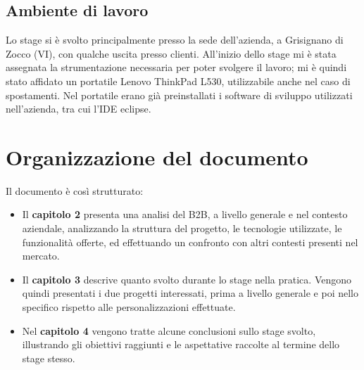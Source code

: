 \subsection{Ambiente di lavoro}
Lo stage si è svolto principalmente presso la sede dell'azienda, a Grisignano di Zocco (VI), con qualche uscita presso clienti. All'inizio dello stage mi è stata assegnata la strumentazione necessaria per poter svolgere il lavoro; mi è quindi stato affidato un portatile Lenovo ThinkPad L530, utilizzabile anche nel caso di spostamenti. Nel portatile erano già preinstallati i software di sviluppo utilizzati nell'azienda, tra cui l'\Gls{IDE} \Gls{eclipse}.


\section{Organizzazione del documento}
Il documento è così strutturato:
\begin{itemize}
	\item Il \textbf{capitolo 2} presenta una analisi del B2B, a livello generale e nel contesto aziendale, analizzando la struttura del progetto, le tecnologie utilizzate, le funzionalità offerte, ed effettuando un confronto con altri contesti presenti nel mercato.
	\item Il \textbf{capitolo 3} descrive quanto svolto durante lo stage nella pratica. Vengono quindi presentati i due progetti interessati, prima a livello generale e poi nello specifico rispetto alle personalizzazioni effettuate.
	\item Nel \textbf{capitolo 4} vengono tratte alcune conclusioni sullo stage svolto, illustrando gli obiettivi raggiunti e le aspettative raccolte al termine dello stage stesso.
\end{itemize}